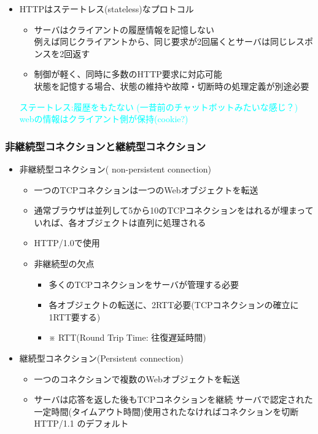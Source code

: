 \begin{itemize}
  \item HTTPはステートレス(stateless)なプロトコル
  \begin{itemize}
    \item サーバはクライアントの履歴情報を記憶しない\\
      例えば同じクライアントから、同じ要求が2回届くとサーバは同じレスポンスを2回返す
    \item 制御が軽く、同時に多数のHTTP要求に対応可能\\
      状態を記憶する場合、状態の維持や故障・切断時の処理定義が別途必要
  \end{itemize}
  \textcolor{cyan}{ステートレス:履歴をもたない (一昔前のチャットボットみたいな感じ？)}\\
  \textcolor{cyan}{webの情報はクライアント側が保持(cookie?)}
\end{itemize}

\subsubsection{非継続型コネクションと継続型コネクション}

\begin{itemize}
  \item 非継続型コネクション( non-persistent connection)
  \begin{itemize}
    \item 一つのTCPコネクションは一つのWebオブジェクトを転送
    \item 通常ブラウザは並列して5から10のTCPコネクションをはれるが埋まっていれば、各オブジェクトは直列に処理される
    \item HTTP/1.0で使用
  \end{itemize}

  \begin{itemize}
    \item 非継続型の欠点
    \begin{itemize}
      \item 多くのTCPコネクションをサーバが管理する必要
      \item 各オブジェクトの転送に、2RTT必要(TCPコネクションの確立に1RTT要する)
      \item[] ※ RTT(Round Trip Time: 往復遅延時間)
    \end{itemize}
  \end{itemize}
\end{itemize}

\begin{itemize}
  \item 継続型コネクション(Persistent connection)
  \begin{itemize}
    \item 一つのコネクションで複数のWebオブジェクトを転送
    \item サーバは応答を返した後もTCPコネクションを継続
    サーバで認定された一定時間(タイムアウト時間)使用されたなければコネクションを切断
    HTTP/1.1 のデフォルト
  \end{itemize}
\end{itemize}

